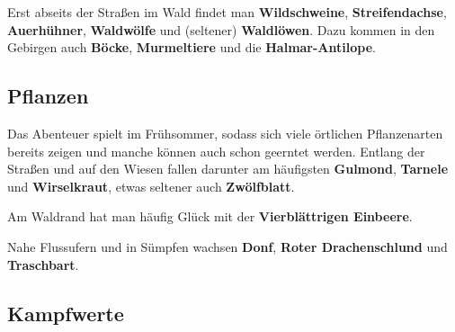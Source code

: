 Erst abseits der Straßen im Wald findet man \textbf{Wildschweine}, \textbf{Streifendachse}, \textbf{Auerhühner}, \textbf{Waldwölfe} und (seltener) \textbf{Waldlöwen}. Dazu kommen in den Gebirgen auch \textbf{Böcke}, \textbf{Murmeltiere} und die \textbf{Halmar-Antilope}.

\neuespalte

\subsection*{Pflanzen}
Das Abenteuer spielt im Frühsommer, sodass sich viele örtlichen Pflanzenarten bereits zeigen und manche können auch schon geerntet werden. Entlang der Straßen und auf den Wiesen fallen darunter am häufigsten \textbf{Gulmond}, \textbf{Tarnele} und \textbf{Wirselkraut}, etwas seltener auch \textbf{Zwölfblatt}.

Am Waldrand hat man häufig Glück mit der \textbf{Vierblättrigen Einbeere}.

Nahe Flussufern und in Sümpfen wachsen \textbf{Donf}, \textbf{Roter Drachenschlund} und \textbf{Traschbart}.

\spaltenende
{}
\neueseite
\spaltenanfang

\subsection[Kampfwerte, NSCs und generische Namen]{Kampfwerte}




